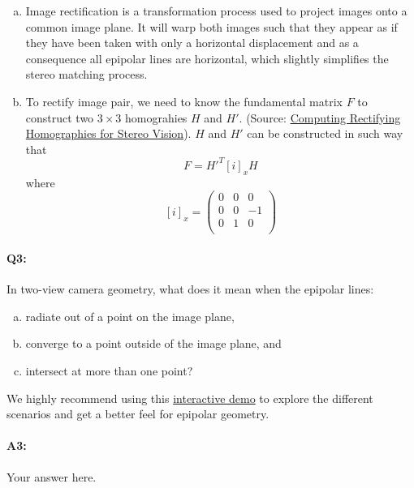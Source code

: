 \begin{enumerate}[(a)]

    \item Image rectification is a transformation process used to project images onto a common image plane. It will warp both images such that they appear as if they have been taken with only a horizontal displacement and as a consequence all epipolar lines are horizontal, which slightly simplifies the stereo matching process.

    \item To rectify image pair, we need to know the fundamental matrix $F$ to construct two $3\times 3$ homograhies $H$ and $H'$. (Source: \href{http://dev.ipol.im/~morel/Dossier_MVA_2011_Cours_Transparents_Documents/2011_Cours7_Document2_Loop-Zhang-CVPR1999.pdf}{Computing Rectifying Homographies for Stereo Vision}). $H$ and $H'$ can be constructed in such way that
          \[F = H'^T[i]_xH\]
          where
          \[[i]_x = \begin{pmatrix}
                  0 & 0 & 0  \\
                  0 & 0 & -1 \\
                  0 & 1 & 0  \\
              \end{pmatrix}\]
\end{enumerate}


\pagebreak
\paragraph{Q3:} In two-view camera geometry, what does it mean when the epipolar lines:
\begin{enumerate}[(a)]
    \item radiate out of a point on the image plane,
    \item converge to a point outside of the image plane, and
    \item intersect at more than one point?
\end{enumerate}

We highly recommend using this \href{https://browncsci1430.github.io/webpage/demos/stereo_camera_visualization/index.html}{interactive demo} to explore the different scenarios and get a better feel for epipolar geometry.

\paragraph{A3:} Your answer here.

